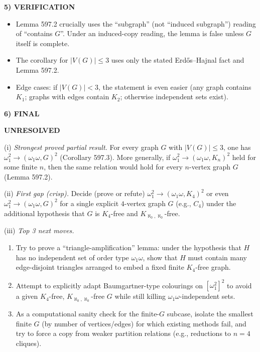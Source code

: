 \noindent\textbf{5) VERIFICATION}\par
\begin{itemize}
\item Lemma 597.2 crucially uses the ``subgraph'' (not ``induced subgraph'') reading of ``contains $G$''. Under an induced-copy reading, the lemma is false unless $G$ itself is complete.
\item The corollary for $|V(G)|\le 3$ uses only the stated Erd\H{o}s--Hajnal fact and Lemma 597.2.
\item Edge cases: if $|V(G)|<3$, the statement is even easier (any graph contains $K_1$; graphs with edges contain $K_2$; otherwise independent sets exist).
\end{itemize}

\noindent\textbf{6) FINAL}\par
\textbf{UNRESOLVED}

(i) \emph{Strongest proved partial result.} For every graph $G$ with $|V(G)|\le 3$, one has $\omega_1^2\to(\omega_1\omega,G)^2$ (Corollary 597.3). More generally, if $\omega_1^2\to(\omega_1\omega,K_n)^2$ held for some finite $n$, then the same relation would hold for every $n$-vertex graph $G$ (Lemma 597.2).

(ii) \emph{First gap (crisp).} Decide (prove or refute) $\omega_1^2\to(\omega_1\omega,K_4)^2$ or even $\omega_1^2\to(\omega_1\omega,G)^2$ for a single explicit $4$-vertex graph $G$ (e.g., $C_4$) under the additional hypothesis that $G$ is $K_4$-free and $K_{\aleph_0,\aleph_0}$-free.

(iii) \emph{Top 3 next moves.}
\begin{enumerate}
\item Try to prove a ``triangle-amplification'' lemma: under the hypothesis that $H$ has no independent set of order type $\omega_1\omega$, show that $H$ must contain many edge-disjoint triangles arranged to embed a fixed finite $K_4$-free graph.
\item Attempt to explicitly adapt Baumgartner-type colourings on $[\omega_1^2]^2$ to avoid a given $K_4$-free, $K_{\aleph_0,\aleph_0}$-free $G$ while still killing $\omega_1\omega$-independent sets.
\item As a computational sanity check for the finite-$G$ subcase, isolate the smallest finite $G$ (by number of vertices/edges) for which existing methods fail, and try to force a copy from weaker partition relations (e.g., reductions to $n=4$ cliques).
\end{enumerate}

